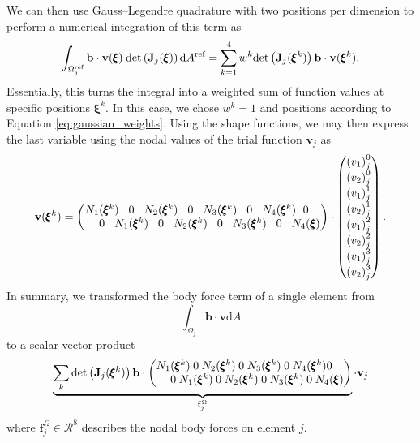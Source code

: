 We can then use Gauss–Legendre quadrature with two positions per dimension to perform a numerical integration of this term as
\begin{equation}
    \int_{\Omega_j^\textrm{ref}} \mathbf{b} \cdot \mathbf{v}(\pmb{\xi}) \hspace{0.25em}\text{det}\left(\mathbf{J}_j(\pmb{\xi})\right)\text{d}A^\textrm{ref}
    = \sum_{k=1}^4 w^k \text{det}\left(\mathbf{J}_j(\pmb{\xi}^k)\right) \mathbf{b} \cdot \mathbf{v}(\pmb{\xi}^k).
\end{equation}
Essentially, this turns the integral into a weighted sum of function values at specific positions $\pmb{\xi}^k$. In this case, we chose $w^k=1$ and positions according to Equation \eqref{eq:gaussian_weights}.
Using the shape functions, we may then express the last variable using the nodal values of the trial function $\mathbf{v}_j$ as  
\begin{equation}
    \setlength\arraycolsep{-2pt}
    \mathbf{v}(\pmb{\xi}^k) 
    =
    \begin{pmatrix}
            N_1(\pmb{\xi}^k) & 0 & N_2(\pmb{\xi}^k) & 0 & N_3(\pmb{\xi}^k) & 0 & N_4(\pmb{\xi}^k) & 0\\
            0 & N_1(\pmb{\xi}^k) & 0 & N_2(\pmb{\xi}^k) & 0 & N_3(\pmb{\xi}^k) & 0 & N_4(\pmb{\xi})\\
    \end{pmatrix}
    \cdot 
    \begin{pmatrix}
            {(v_1)}_j^0 \\
            {(v_2)}_j^0 \\
            {(v_1)}_j^1 \\
            {(v_2)}_j^1 \\
            {(v_1)}_j^2 \\
            {(v_2)}_j^2 \\
            {(v_1)}_j^3 \\
            {(v_2)}_j^3 
    \end{pmatrix}.
    \label{eq:shape_interpolation}
\end{equation}
In summary, we transformed the body force term of a single element from 
\begin{equation}
    \int_{\Omega_j} \mathbf{b} \cdot \mathbf{v} \text{d}A  
\end{equation}
to a scalar vector product 
\begin{equation}
    \setlength\arraycolsep{-5pt}
    \underbrace{\sum_k \text{det}\left(\mathbf{J}_j(\pmb{\xi}^k)\right) \mathbf{b} \cdot
    \begin{pmatrix}
            N_1(\pmb{\xi}^k) & 0 & N_2(\pmb{\xi}^k) & 0 & N_3(\pmb{\xi}^k) & 0 & N_4(\pmb{\xi}^k) & 0\\
            0 & N_1(\pmb{\xi}^k) & 0 & N_2(\pmb{\xi}^k) & 0 & N_3(\pmb{\xi}^k) & 0 & N_4(\pmb{\xi})\\
    \end{pmatrix}}_{\mathbf{f}^\Omega_j}
    \cdot 
    \mathbf{v}_j
\end{equation}
where $\mathbf{f}^\Omega_j \in \mathcal{R}^8$ describes the nodal body forces on element $j$. 

